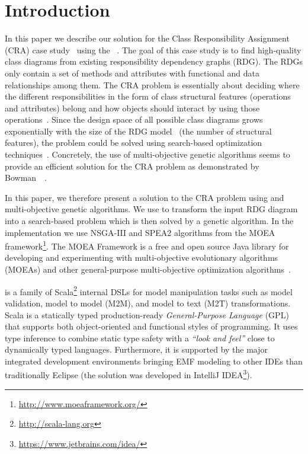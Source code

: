 

\section{Introduction}
\label{sec:Introduction}

In this paper we describe our solution for the \TTC Class Responsibility Assignment (CRA) case study~\cite{Fleck2016} using the \SIGMA~\cite{Krikava2014}.
The goal of this case study is to find high-quality class diagrams from existing responsibility dependency graphs (RDG).
The RDGs only contain a set of methods and attributes with functional and data relationships among them.
The CRA problem is essentially about deciding where the different responsibilities in the form of class structural features (\Ie operations and attributes) belong and how objects should interact by using those operations~\cite{bowman2010solving}.
Since the design space of all possible class diagrams grows exponentially with the size of the RDG model~\cite{Fleck2016} (\Ie the number of structural features), the problem could be solved using search-based optimization techniques~\cite{coello2007evolutionary}.
Concretely, the use of multi-objective genetic algorithms seems to provide an efficient solution for the CRA problem as demonstrated by Bowman~\Etal~\cite{bowman2010solving}.

In this paper, we therefore present a solution to the CRA problem using \SIGMA and multi-objective genetic algorithms.
We use \SIGMA to transform the input RDG diagram into a search-based problem which is then solved by a genetic algorithm.
In the implementation we use NSGA-III and SPEA2 algorithms from the MOEA framework\footnote{\url{http://www.moeaframework.org/}}.
The MOEA Framework is a free and open source Java library for developing and experimenting with multi-objective evolutionary algorithms (MOEAs) and other general-purpose multi-objective optimization algorithms~\cite{moea}.

\SIGMA is a family of Scala\footnote{\url{http://scala-lang.org}} internal DSLs for model manipulation tasks such as model validation, model to model (M2M), and model to text (M2T) transformations.
Scala is a statically typed production-ready \emph{General-Purpose Language} (GPL) that supports both object-oriented and functional styles of programming.
It uses type inference to combine static type safety with a \emph{``look and feel''} close to dynamically typed languages.
Furthermore, it is supported by the major integrated development environments bringing EMF modeling to other IDEs than traditionally Eclipse (the solution was developed in IntelliJ IDEA\footnote{\url{https://www.jetbrains.com/idea/}}).

